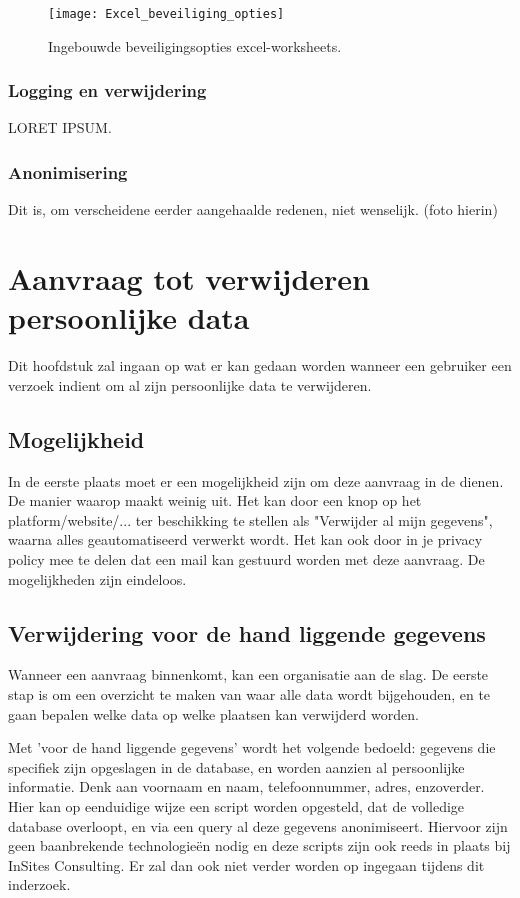 \begin{figure}[h]
	\centering
	\texttt{[image: Excel\_beveiliging\_opties]}
	\label{fig:excelbeveiliging}
	\caption{Ingebouwde beveiligingsopties excel-worksheets.}
\end{figure}


\subsubsection{Logging en verwijdering}
LORET IPSUM. 

\subsubsection{Anonimisering}
 Dit is, om verscheidene eerder aangehaalde redenen, niet wenselijk. 
(foto hierin)

\section{Aanvraag tot verwijderen persoonlijke data}

Dit hoofdstuk zal ingaan op wat er kan gedaan worden wanneer een gebruiker een verzoek indient om al zijn persoonlijke data te verwijderen. 

\subsection{Mogelijkheid}
In de eerste plaats moet er een mogelijkheid zijn om deze aanvraag in de dienen. De manier waarop maakt weinig uit. Het kan door een knop op het platform/website/... ter beschikking te stellen als "Verwijder al mijn gegevens", waarna alles geautomatiseerd verwerkt wordt. Het kan ook door in je privacy policy mee te delen dat een mail kan gestuurd worden met deze aanvraag. De mogelijkheden zijn eindeloos. 

\subsection{Verwijdering voor de hand liggende gegevens}
Wanneer een aanvraag binnenkomt, kan een organisatie aan de slag. De eerste stap is om een overzicht te maken van waar alle data wordt bijgehouden, en te gaan bepalen welke data op welke plaatsen kan verwijderd worden. 


Met 'voor de hand liggende gegevens' wordt het volgende bedoeld: gegevens die specifiek zijn opgeslagen in de database, en worden aanzien al persoonlijke informatie. Denk aan voornaam en naam, telefoonnummer, adres, enzoverder. \\ 
Hier kan op eenduidige wijze een script worden opgesteld, dat de volledige database overloopt, en via een query al deze gegevens anonimiseert. Hiervoor zijn geen baanbrekende technologieën nodig en deze scripts zijn ook reeds in plaats bij InSites Consulting. Er zal dan ook niet verder worden op ingegaan tijdens dit inderzoek. 
 
